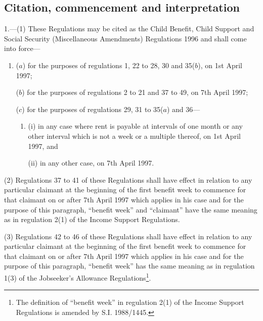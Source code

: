 \documentclass[a4paper]{article}
\newcommand\fnote[1]{\footnote{\frenchspacing #1}}
\begin{document}
{\sloppy

\tableofcontents

}

\setcounter{secnumdepth}{-2}

\subsection[1. Citation, commencement and interpretation]{Citation, commencement and interpretation}

1.—(1) These Regulations may be cited as the Child Benefit, Child Support and Social Security (Miscellaneous Amendments) Regulations 1996 and shall come into force—
\begin{enumerate}\item[]
($a$) for the purposes of regulations 1, 22 to 28, 30 and 35($b$), on 1st April 1997;

($b$) for the purposes of regulations 2 to 21 and 37 to 49, on 7th April 1997;

($c$) for the purposes of regulations 29, 31 to 35($a$) and 36—
\begin{enumerate}\item[]
(i) in any case where rent is payable at intervals of one month or any other interval which is not a week or a multiple thereof, on 1st April 1997, and

(ii) in any other case, on 7th April 1997.
\end{enumerate}
\end{enumerate}

(2) Regulations 37 to 41 of these Regulations shall have effect in relation to any particular claimant at the beginning of the first benefit week to commence for that claimant on or after 7th April 1997 which applies in his case and for the purpose of this paragraph, “benefit week” and “claimant” have the same meaning as in regulation 2(1) of the Income Support Regulations.

(3) Regulations 42 to 46 of these Regulations shall have effect in relation to any particular claimant at the beginning of the first benefit week to commence for that claimant on or after 7th April 1997 which applies in his case and for the purpose of this paragraph, “benefit week” has the same meaning as in regulation 1(3) of the Jobseeker’s Allowance Regulations\fnote{The definition of “benefit week” in regulation 2(1) of the Income Support Regulations is amended by S.I. 1988/1445.}.
\end{document}
